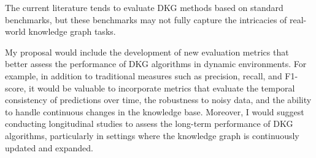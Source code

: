 The current literature tends to evaluate DKG methods based on standard benchmarks, but these benchmarks may not fully capture the intricacies of real-world knowledge graph tasks.

My proposal would include the development of new evaluation metrics that better assess the performance of DKG algorithms in dynamic environments. For example, in addition to traditional 
measures such as precision, recall, and F1-score, it would be valuable to incorporate metrics that evaluate the temporal consistency of predictions over time, the robustness to noisy data, 
and the ability to handle continuous changes in the knowledge base. Moreover, I would suggest conducting longitudinal studies to assess the long-term performance of DKG algorithms, 
particularly in settings where the knowledge graph is continuously updated and expanded.
